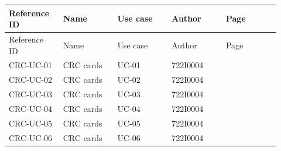 \begin{longtable}{>{\raggedright\arraybackslash}p{0.1840\linewidth}>{\raggedright\arraybackslash}p{0.1840\linewidth}>{\raggedright\arraybackslash}p{0.1840\linewidth}>{\raggedright\arraybackslash}p{0.1840\linewidth}>{\raggedright\arraybackslash}p{0.1840\linewidth}}
Reference ID & Name & Use case & Author & Page \\
\hline\endfirsthead
Reference ID & Name & Use case & Author & Page \\
\hline\endhead
CRC-UC-01 & CRC cards & UC-01 & 722I0004 & \pageref{CRC-UC-01} \\
CRC-UC-02 & CRC cards & UC-02 & 722I0004 & \pageref{CRC-UC-02} \\
CRC-UC-03 & CRC cards & UC-03 & 722I0004 & \pageref{CRC-UC-03} \\
CRC-UC-04 & CRC cards & UC-04 & 722I0004 & \pageref{CRC-UC-04} \\
CRC-UC-05 & CRC cards & UC-05 & 722I0004 & \pageref{CRC-UC-05} \\
CRC-UC-06 & CRC cards & UC-06 & 722I0004 & \pageref{CRC-UC-06} \\
\end{longtable}
